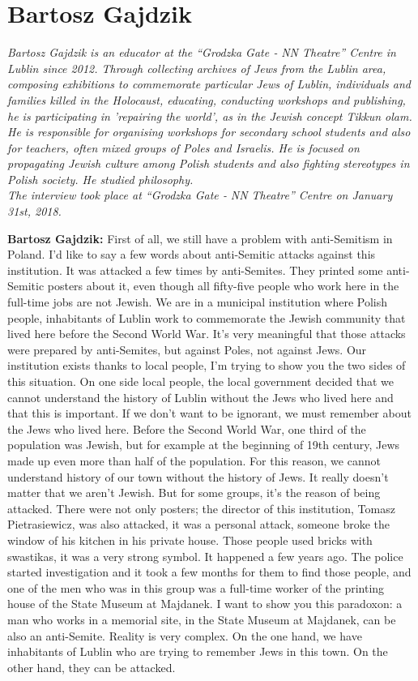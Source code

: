 \section{Bartosz Gajdzik}

\textit{Bartosz Gajdzik is an educator at the ``Grodzka Gate ‐ NN Theatre'' Centre in Lublin since 2012. Through collecting archives of Jews from the Lublin area, composing exhibitions to commemorate particular Jews of Lublin, individuals and families killed in the Holocaust, educating, conducting workshops and publishing, he is participating in 'repairing the world', as in the Jewish concept \textit{Tikkun olam}. He is responsible for organising workshops for secondary school students and also for teachers, often mixed groups of Poles and Israelis. He is focused on propagating Jewish culture among Polish students and also fighting stereotypes in Polish society. He studied philosophy.\\
The interview took place at ``Grodzka Gate ‐ NN Theatre'' Centre on January 31st, 2018.}\par
\vspace*{2em}
\textbf{Bartosz Gajdzik:} First of all, we still have a problem with anti-Semitism in Poland. I’d like to say a few words about anti-Semitic attacks against this institution. It was attacked a few times by anti-Semites. They printed some anti-Semitic posters about it, even though all fifty-five people who work here in the full-time jobs are not Jewish. We are in a municipal institution where Polish people, inhabitants of Lublin work to commemorate the Jewish community that lived here before the Second World War. It’s very meaningful that those attacks were prepared by anti-Semites, but against Poles, not against Jews. Our institution exists thanks to local people, I’m trying to show you the two sides of this situation. On one side local people, the local government decided that we cannot understand the history of Lublin without the Jews who lived here and that this is important. If we don’t want to be ignorant, we must remember about the Jews who lived here. Before the Second World War, one third of the population was Jewish, but for example at the beginning of 19th century, Jews made up even more than half of the population. For this reason, we cannot understand history of our town without the history of Jews. It really doesn’t matter that we aren’t Jewish. But for some groups, it’s the reason of being attacked. There were not only posters; the director of this institution, Tomasz Pietrasiewicz, was also attacked, it was a personal attack, someone broke the window of his kitchen in his private house. Those people used bricks with swastikas, it was a very strong symbol. It happened a few years ago. The police started investigation and it took a few months for them to find those people, and one of the men who was in this group was a full-time worker of the printing house of the State Museum at Majdanek. I want to show you this paradoxon: a man who works in a memorial site, in the State Museum at Majdanek, can be also an anti-Semite. Reality is very complex. On the one hand, we have inhabitants of Lublin who are trying to remember Jews in this town. On the other hand, they can be attacked.  
